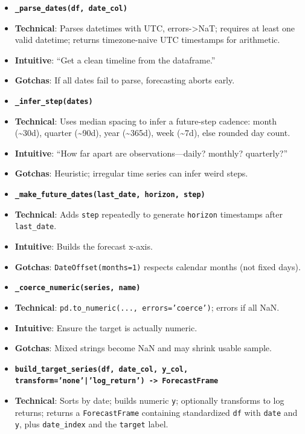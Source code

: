 \documentclass[11pt]{article}
\begin{document}
\begin{itemize}[leftmargin=*,nosep]
\item \textbf{\texttt{\_parse\_dates(df, date\_col)}}
\item \textbf{Technical}: Parses datetimes with UTC, errors->NaT; requires at least one valid datetime; returns timezone-naive UTC timestamps for arithmetic.
\item \textbf{Intuitive}: “Get a clean timeline from the dataframe.”
\item \textbf{Gotchas}: If all dates fail to parse, forecasting aborts early.
\item \textbf{\texttt{\_infer\_step(dates)}}
\item \textbf{Technical}: Uses median spacing to infer a future-step cadence: month (\textasciitilde{}30d), quarter (\textasciitilde{}90d), year (\textasciitilde{}365d), week (\textasciitilde{}7d), else rounded day count.
\item \textbf{Intuitive}: “How far apart are observations—daily? monthly? quarterly?”
\item \textbf{Gotchas}: Heuristic; irregular time series can infer weird steps.
\item \textbf{\texttt{\_make\_future\_dates(last\_date, horizon, step)}}
\item \textbf{Technical}: Adds \texttt{step} repeatedly to generate \texttt{horizon} timestamps after \texttt{last\_date}.
\item \textbf{Intuitive}: Builds the forecast x-axis.
\item \textbf{Gotchas}: \texttt{DateOffset(months=1)} respects calendar months (not fixed days).
\item \textbf{\texttt{\_coerce\_numeric(series, name)}}
\item \textbf{Technical}: \texttt{pd.to\_numeric(..., errors='coerce')}; errors if all NaN.
\item \textbf{Intuitive}: Ensure the target is actually numeric.
\item \textbf{Gotchas}: Mixed strings become NaN and may shrink usable sample.
\item \textbf{\texttt{build\_target\_series(df, date\_col, y\_col, transform='none'|'log\_return') -> ForecastFrame}}
\item \textbf{Technical}: Sorts by date; builds numeric \texttt{y}; optionally transforms to log returns; returns a \texttt{ForecastFrame} containing standardized \texttt{df} with \texttt{date} and \texttt{y}, plus \texttt{date\_index} and the \texttt{target} label.

\end{itemize}
\end{document}

